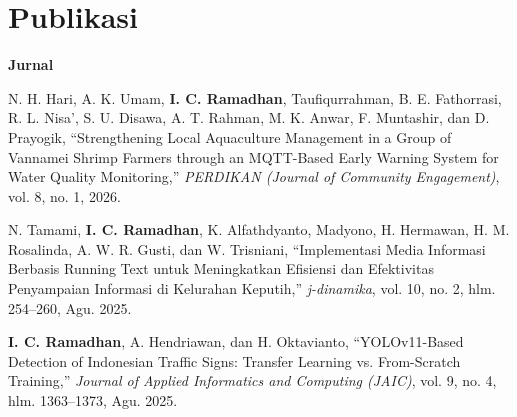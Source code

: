 \vspace{18pt}
\section{Publikasi}




\vspace{4pt}
\noindent\textbf{Jurnal}
\begin{enumerate}[label={[J\arabic*]}, leftmargin=2.8em]
  \item N. H. Hari, A. K. Umam, \textbf{I. C. Ramadhan}, Taufiqurrahman, B. E. Fathorrasi,
        R. L. Nisa', S. U. Disawa, A. T. Rahman, M. K. Anwar, F. Muntashir, dan D. Prayogik,
        ``Strengthening Local Aquaculture Management in a Group of Vannamei Shrimp Farmers
        through an MQTT-Based Early Warning System for Water Quality Monitoring,''
        \textit{PERDIKAN (Journal of Community Engagement)}, vol. 8, no. 1, 2026.

  \item N. Tamami, \textbf{I. C. Ramadhan}, K. Alfathdyanto, Madyono, H. Hermawan,
        H. M. Rosalinda, A. W. R. Gusti, dan W. Trisniani,
        ``Implementasi Media Informasi Berbasis Running Text untuk Meningkatkan
        Efisiensi dan Efektivitas Penyampaian Informasi di Kelurahan Keputih,''
        \textit{j-dinamika}, vol. 10, no. 2, hlm. 254--260, Agu. 2025.

  \item \textbf{I. C. Ramadhan}, A. Hendriawan, dan H. Oktavianto,
        ``YOLOv11-Based Detection of Indonesian Traffic Signs: Transfer Learning
        vs. From-Scratch Training,''
        \textit{Journal of Applied Informatics and Computing (JAIC)}, vol. 9,
        no. 4, hlm. 1363--1373, Agu. 2025.
\end{enumerate}

